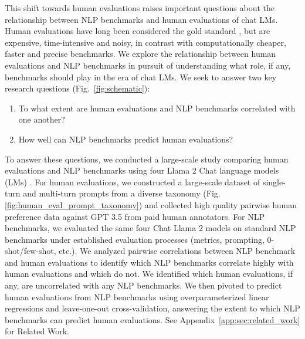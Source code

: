 This shift towards human evaluations raises important questions about the relationship between NLP benchmarks and human evaluations of chat LMs.
Human evaluations have long been considered the gold standard \citep{gatt2018survey,van2019best,celikyilmaz2020evaluation,roller2020opendomainconversationalagentscurrent,van2021human}, but are expensive, time-intensive and noisy, in contrast with computationally cheaper, faster and precise benchmarks.
We explore the relationship between human evaluations and NLP benchmarks in pursuit of understanding what role, if any, benchmarks should play in the era of chat LMs.
We seek to answer two key research questions (Fig.~\ref{fig:schematic}):
%
\begin{enumerate}
    \item To what extent are human evaluations and NLP benchmarks correlated with one another?
    \item How well can NLP benchmarks predict human evaluations?
\end{enumerate}
%
To answer these questions, we conducted a large-scale study comparing human evaluations and NLP benchmarks using four Llama 2 Chat language models (LMs) \citep{touvron2023llama2}. For human evaluations, we constructed a large-scale dataset of single-turn and multi-turn prompts from a diverse taxonomy (Fig. \ref{fig:human_eval_prompt_taxonomy}) and collected high quality pairwise human preference data against GPT 3.5 \citep{ouyang2022training} from paid human annotators. For NLP benchmarks, we evaluated the same four Chat Llama 2 models on standard NLP benchmarks under established evaluation processes (metrics, prompting, 0-shot/few-shot, etc.). We analyzed pairwise correlations between NLP benchmark and human evaluations to identify which NLP benchmarks correlate highly with human evaluations and which do not.
We identified which human evaluations, if any, are uncorrelated with any NLP benchmarks.
We then pivoted to predict human evaluations from NLP benchmarks using overparameterized linear regressions and leave-one-out cross-validation, answering the extent to which NLP benchmarks can predict human evaluations. See Appendix~\ref{app:sec:related_work} for Related Work.


